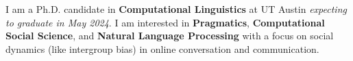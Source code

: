I am a Ph.D. candidate in \textbf{Computational Linguistics} at UT Austin \emph{expecting to graduate in May 2024}. I am interested in \textbf{Pragmatics}, \textbf{Computational Social Science}, and \textbf{Natural Language Processing} with a focus on social dynamics (like intergroup bias) in online conversation and communication.
